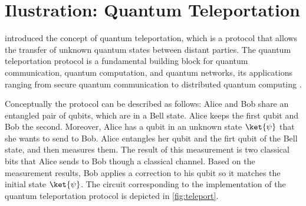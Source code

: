 






\section{Ilustration: Quantum Teleportation} \label{sec:teleport}

\cite{bennett1993teleporting} introduced the concept of quantum teleportation, which is a protocol that allows the transfer of   unknown quantum states between distant parties.  The quantum teleportation protocol is a fundamental building block for quantum communication, quantum computation, and quantum networks, its applications ranging
from secure quantum communication to distributed quantum computing \cite{briegel1998quantum,gottesman1999demonstrating,kimble2008quantum}. %

Conceptually the protocol can be described as follows: Alice and Bob share an entangled pair of qubits, which are in a Bell state. Alice keeps the first qubit and Bob the second. Moreover, Alice has a qubit in an unknown state $\ket{\psi}$ that she wants to send to Bob.  
 Alice entangles her qubit and the firt qubit of the Bell state, and then measures them. The result of this measurement is two classical bits that Alice sends to Bob though a classical channel. Based on the measurement results, Bob applies a correction to his qubit so it matches the initial state $\ket{\psi}$. 
The circuit corresponding to the implementation of the quantum teleportation protocol is depicted in \autoref{fig:teleport}. 

